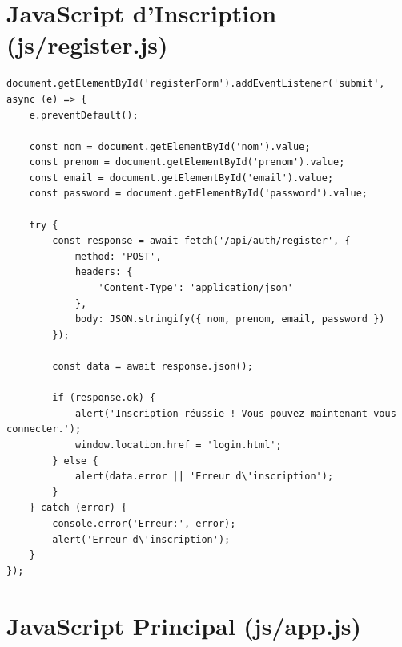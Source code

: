 \section{JavaScript d'Inscription (js/register.js)}

\begin{lstlisting}[style=javascript, caption=public/js/register.js - Script d'inscription]
document.getElementById('registerForm').addEventListener('submit', async (e) => {
    e.preventDefault();
    
    const nom = document.getElementById('nom').value;
    const prenom = document.getElementById('prenom').value;
    const email = document.getElementById('email').value;
    const password = document.getElementById('password').value;
    
    try {
        const response = await fetch('/api/auth/register', {
            method: 'POST',
            headers: {
                'Content-Type': 'application/json'
            },
            body: JSON.stringify({ nom, prenom, email, password })
        });
        
        const data = await response.json();
        
        if (response.ok) {
            alert('Inscription réussie ! Vous pouvez maintenant vous connecter.');
            window.location.href = 'login.html';
        } else {
            alert(data.error || 'Erreur d\'inscription');
        }
    } catch (error) {
        console.error('Erreur:', error);
        alert('Erreur d\'inscription');
    }
});
\end{lstlisting}

\section{JavaScript Principal (js/app.js)}

